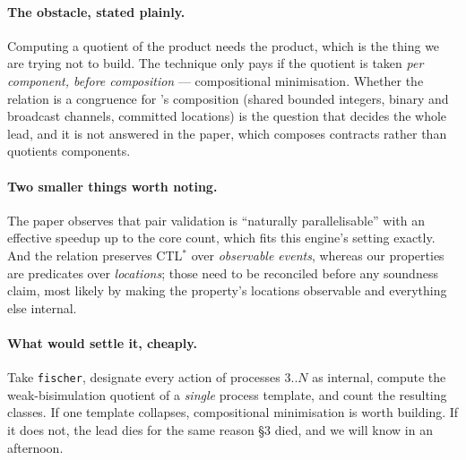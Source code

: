 \paragraph{The obstacle, stated plainly.} Computing a quotient of the product needs the product,
which is the thing we are trying not to build. The technique only pays if the quotient is taken
\emph{per component, before composition} --- compositional minimisation. Whether the relation is a
congruence for \uppaal{}'s composition (shared bounded integers, binary and broadcast channels,
committed locations) is the question that decides the whole lead, and it is not answered in the
paper, which composes contracts rather than quotients components.

\paragraph{Two smaller things worth noting.} The paper observes that pair validation is
``naturally parallelisable'' with an effective speedup up to the core count, which fits this
engine's setting exactly. And the relation preserves CTL$^*$ over \emph{observable events}, whereas
our properties are predicates over \emph{locations}; those need to be reconciled before any
soundness claim, most likely by making the property's locations observable and everything else
internal.

\paragraph{What would settle it, cheaply.} Take \texttt{fischer}, designate every action of
processes $3..N$ as internal, compute the weak-bisimulation quotient of a \emph{single} process
template, and count the resulting classes. If one template collapses, compositional minimisation is
worth building. If it does not, the lead dies for the same reason \S3 died, and we will know in an
afternoon.
